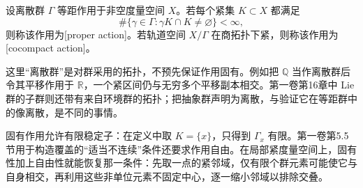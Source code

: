 \begin{definition}\label{g3:def:D-proper-cocompact-action}
	设离散群 \(\Gamma\) 等距作用于非空度量空间 \(X\)。若每个紧集 \(K\subset X\) 都满足
	\begin{equation}\label{g3:eq:D-proper-action}
		\#\{\gamma\in\Gamma:\gamma K\cap K\ne\varnothing\}<\infty,
	\end{equation}
	则称该作用为[proper action]。若轨道空间 \(X/\Gamma\) 在商拓扑下紧，则称该作用为[cocompact action]。
\end{definition}

这里“离散群”是对群采用的拓扑，不预先保证作用固有。例如把 \(\mathbb Q\) 当作离散群后令其平移作用于 \(\mathbb R\)，一个紧区间仍与无穷多个平移副本相交。第一卷第16章中 Lie 群的子群则还带有来自环境群的拓扑；把抽象群声明为离散，与验证它在等距群中的像离散，是不同的事情。

\ProseParagraphBreak

固有作用允许有限稳定子：在定义中取 \(K=\{x\}\)，只得到 \(\Gamma_x\) 有限。第一卷第5.5节用于构造覆盖的“适当不连续”条件还要求作用自由。在局部紧度量空间上，固有性加上自由性就能恢复那一条件：先取一点的紧邻域，仅有限个群元素可能使它与自身相交，再利用这些非单位元素不固定中心，逐一缩小邻域以排除交叠。

